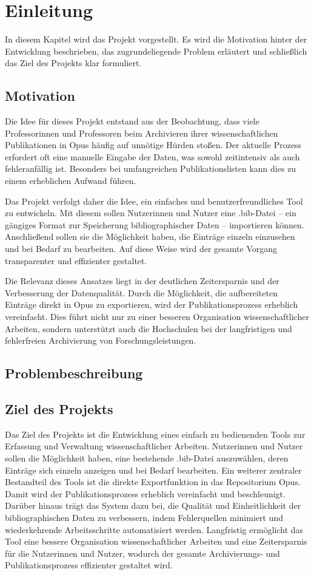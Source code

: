 \chapter{Einleitung}
In diesem Kapitel wird das Projekt vorgestellt. Es wird die Motivation 
hinter der Entwicklung beschrieben, das zugrundeliegende Problem erläutert
und schließlich das Ziel des Projekts klar formuliert. 

\section{Motivation}
Die Idee für dieses Projekt entstand aus der Beobachtung, dass viele 
Professorinnen und Professoren beim Archivieren ihrer wissenschaftlichen 
Publikationen in Opus häufig auf unnötige Hürden stoßen. Der aktuelle Prozess 
erfordert oft eine manuelle Eingabe der Daten, was sowohl zeitintensiv 
als auch fehleranfällig ist. Besonders bei umfangreichen Publikationslisten 
kann dies zu einem erheblichen Aufwand führen.

Das Projekt verfolgt daher die Idee, ein einfaches und 
benutzerfreundliches Tool zu entwickeln. Mit diesem sollen Nutzerinnen und 
Nutzer eine .bib-Datei – ein gängiges Format zur Speicherung 
bibliographischer Daten – importieren können. Anschließend sollen sie die 
Möglichkeit haben, die Einträge einzeln einzusehen und bei Bedarf zu 
bearbeiten. Auf diese Weise wird der gesamte Vorgang transparenter und 
effizienter gestaltet.

Die Relevanz dieses Ansatzes liegt in der deutlichen Zeitersparnis und der 
Verbesserung der Datenqualität. Durch die Möglichkeit, die aufbereiteten 
Einträge direkt in Opus zu exportieren, wird der Publikationsprozess 
erheblich vereinfacht. Dies führt nicht nur zu einer besseren Organisation 
wissenschaftlicher Arbeiten, sondern unterstützt auch die Hochschulen bei 
der langfristigen und fehlerfreien Archivierung von Forschungsleistungen.

\section{Problembeschreibung}


\section{Ziel des Projekts}
Das Ziel des Projekts ist die Entwicklung eines einfach zu bedienenden 
Tools zur Erfassung und Verwaltung wissenschaftlicher Arbeiten. 
Nutzerinnen und Nutzer sollen die Möglichkeit haben, eine bestehende 
.bib-Datei auszuwählen, deren Einträge sich einzeln anzeigen und bei 
Bedarf bearbeiten. Ein weiterer zentraler Bestandteil des Tools ist die direkte Exportfunktion
in das Repositorium Opus. Damit wird der Publikationsprozess erheblich 
vereinfacht und beschleunigt. Darüber hinaus trägt das System dazu bei, 
die Qualität und Einheitlichkeit der bibliographischen Daten zu verbessern,
indem Fehlerquellen minimiert und wiederkehrende Arbeitsschritte 
automatisiert werden. Langfristig ermöglicht das Tool eine bessere Organisation 
wissenschaftlicher Arbeiten und eine Zeitersparnis für die 
Nutzerinnen und Nutzer, wodurch der gesamte Archivierungs- 
und Publikationsprozess effizienter gestaltet wird.

